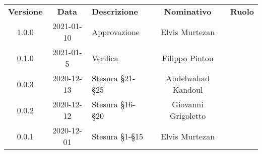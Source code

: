 {
    \renewcommand{\arraystretch}{1.5}
    \centering
    \begin{longtable}{ c c  C{4cm}  c  c }
        \rowcolor{\primaryColor}
        \textcolor{\secondaryColor}{
        \textbf{Versione}}     & \textcolor{\secondaryColor}{\textbf{Data}}       & \textcolor{\secondaryColor}
        {\textbf{Descrizione}} & \textcolor{\secondaryColor}{\textbf{Nominativo}} & \textcolor{\secondaryColor}{\textbf{Ruolo}}                          \\


        1.0.0                  & 2021-01-10                                       & Approvazione              & Elvis Murtezan& \responsabile{} \\

        0.1.0                  & 2021-01-5                                       & Verifica             & Filippo Pinton & \verificatore{} \\

        0.0.3                  & 2020-12-13                                       & Stesura §21-§25              & Abdelwahad Kandoul & \analista{} \\
        
        0.0.2                  & 2020-12-12                                       & Stesura §16-§20              & Giovanni Grigoletto & \analista{} \\

        0.0.1                  & 2020-12-01                                       & Stesura §1-§15              & Elvis Murtezan & \analista{} \\
    \end{longtable}
}